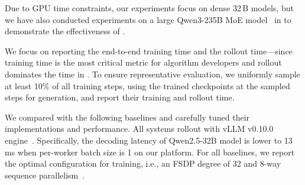 Due to GPU time constraints, our experiments focus on dense 32\,B
models, but we have also conducted experiments on a large 
Qwen3-235B MoE model~\cite{qwen3}
in \textsection{\ref{sec:eval-moe}} to demonstrate the effectiveness of {\sys}. 

We focus on reporting the end-to-end training time and the rollout time---since
training time is the most critical metric for algorithm developers
and rollout dominates the time in \textsection{\ref{sec:bg-post-training}}.
To ensure representative evaluation, we uniformly sample at least 10\% of all training steps,
using the trained checkpoints at the sampled steps for generation,
and report their training and rollout time.

We compared {\sys} with the following baselines and carefully tuned their
implementations and performance.
All systems rollout with vLLM v0.10.0 engine~\cite{vllm-code}.
Specifically,
the decoding latency of Qwen2.5-32B model
is lower to 13\,ms when per-worker batch size is 1 on our platform. 
For all baselines, we report the optimal configuration for training,
i.e., an FSDP degree of 32 and 8-way sequence parallelism~\cite{ulysses-sp}.
\\[-10pt]

